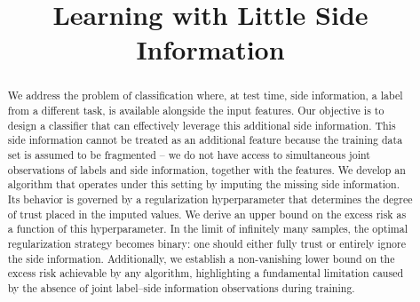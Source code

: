 \documentclass[ejs]{imsart}
\numberwithin{equation}{section}
\theoremstyle{plain}
\theoremstyle{definition}
\theoremstyle{remark}
\begin{document}
\begin{frontmatter}
\title{Learning with Little Side Information}


\begin{abstract}
We address the problem of classification where, at test time, side information, a label from a different task, is available alongside the input features. Our objective is to design a classifier that can effectively leverage this additional side information. This side information cannot be treated as an additional feature because the training data set is assumed to be fragmented -- we do not have access to simultaneous joint observations of labels and side information, together with the features. We develop an algorithm that operates under this setting by imputing the missing side information. Its behavior is governed by a regularization hyperparameter that determines the degree of trust placed in the imputed values. We derive an upper bound on the excess risk as a function of this hyperparameter.
In the limit of infinitely many samples, the optimal regularization strategy becomes binary: one should either fully trust or entirely ignore the side information. Additionally, we establish a non-vanishing lower bound on the excess risk achievable by any algorithm, highlighting a fundamental limitation caused by the absence of joint label--side information observations during training.
\end{abstract}
\begin{keyword}[class=MSC]
\end{keyword}
\end{frontmatter}




\end{document}
